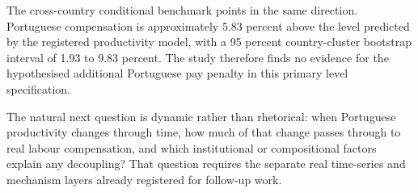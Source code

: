 \documentclass[11pt,a4paper]{article}
\begin{document}
The cross-country conditional benchmark points in the same direction. Portuguese compensation is approximately 5.83 percent above the level predicted by the registered productivity model, with a 95 percent country-cluster bootstrap interval of 1.93 to 9.83 percent. The study therefore finds no evidence for the hypothesised additional Portuguese pay penalty in this primary level specification.

The natural next question is dynamic rather than rhetorical: when Portuguese productivity changes through time, how much of that change passes through to real labour compensation, and which institutional or compositional factors explain any decoupling? That question requires the separate real time-series and mechanism layers already registered for follow-up work.



\end{document}
